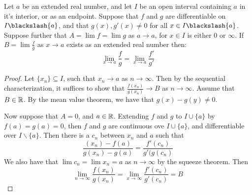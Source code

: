 \begin{theorem}\label{4.3.4}
    Let $a$ be an extended real number, and let  $I$ be an open interval containing  $a$
    in it's interior, or as an endpoint. Suppose that  $f$ and  $g$ are differentiable on  
    $I \blackslash \{a\}$, and that  $g(x), g'(x) \neq 0$ for all  $x \in I \blackslash \{a\}$. 
    Suppose further that  $A=\lim{f}=\lim{g}$ as  $a \rightarrow a$, for  $x \in I$ is either $0$ 
    or  $\infty$. If  $B=\lim{\frac{f}{g}}$ as $x \rightarrow a$ exists as an extended real number
    then:
        \begin{equation}
            \lim_{x \rightarrow a}{\frac{f}{g}}=\lim_{x \rightarrow a}{\frac{f'}{g'}}		
        \end{equation} 
\end{theorem}
\begin{proof}
    Let $\{x_n\} \subseteq I$, such that  $x_n \rightarrow a$ as  $n \rightarrow \infty$. Then by the sequential 
    characterization, it suffices to show that  $ \frac{f(x_n)}{g(x_n)} \rightarrow B$ as 
    $n \rightarrow \infty$. Assume that $B \in \mathbb{R}$. By the mean value theorem, we have 
    that  $g(x)-g(y) \neq 0$.

    Now suppose that  $A=0$, and  $a \in \mathbb{R}$. Extending  $f$ and  $g$ to  $I \cup \{a\}$ by 
    $f(a)=g(a)=0$, then  $f$ and  $g$ are continuous ove  $I \cup \{a\}$, and differentiable 
    over  $I \backslash \{a\}$. Then there is a $c_n$ between  $x_n$ and  $a$ such that 
        \begin{equation*}
            \frac{(x_n)-f(a)}{g(x_n)-g(a)}=\frac{f'(c_n)}{g'(g(c_n)}
        \end{equation*}
    We also have that $\lim{c_n}=\lim{x_n}=a$ as  $n \rightarrow \infty$ by the squeeze theorem.  
    Then 
        \begin{equation*}
            \lim_{n \rightarrow \infty}\frac{f(x_n)}{g(x_n)}=\lim_{x \rightarrow \infty}\frac{f'(c_n)}{g'(c_n)}=B
        \end{equation*}


\end{proof}
